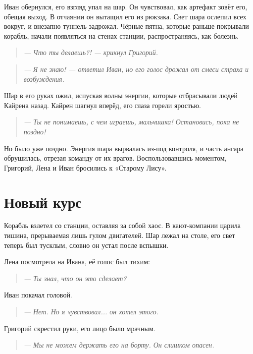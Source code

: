 \documentclass[12pt,a4paper]{book}
\newenvironment{dialogue}{\begin{quote}\itshape}{\end{quote}}
\begin{document}
Иван обернулся, его взгляд упал на шар. Он чувствовал, как артефакт зовёт его, обещая выход. В отчаянии он вытащил его из рюкзака. Свет шара ослепил всех вокруг, и внезапно туннель задрожал. Чёрные пятна, которые раньше покрывали корабль, начали появляться на стенах станции, распространяясь, как болезнь.

\begin{dialogue}
--- Что ты делаешь?! --- крикнул Григорий.
\end{dialogue}

\begin{dialogue}
--- Я не знаю! --- ответил Иван, но его голос дрожал от смеси страха и возбуждения.
\end{dialogue}

Шар в его руках ожил, испуская волны энергии, которые отбрасывали людей Кайрена назад. Кайрен шагнул вперёд, его глаза горели яростью.

\begin{dialogue}
--- Ты не понимаешь, с чем играешь, мальчишка! Остановись, пока не поздно!
\end{dialogue}

Но было уже поздно. Энергия шара вырвалась из-под контроля, и часть ангара обрушилась, отрезая команду от их врагов. Воспользовавшись моментом, Григорий, Лена и Иван бросились к «Старому Лису».

\section*{Новый курс}

Корабль взлетел со станции, оставляя за собой хаос. В кают-компании царила тишина, прерываемая лишь гулом двигателей. Шар лежал на столе, его свет теперь был тусклым, словно он устал после вспышки.

Лена посмотрела на Ивана, её голос был тихим:

\begin{dialogue}
--- Ты знал, что он это сделает?
\end{dialogue}

Иван покачал головой.

\begin{dialogue}
--- Нет. Но я чувствовал... он хотел этого.
\end{dialogue}

Григорий скрестил руки, его лицо было мрачным.

\begin{dialogue}
--- Мы не можем держать его на борту. Он слишком опасен.
\end{dialogue}
\end{document}
